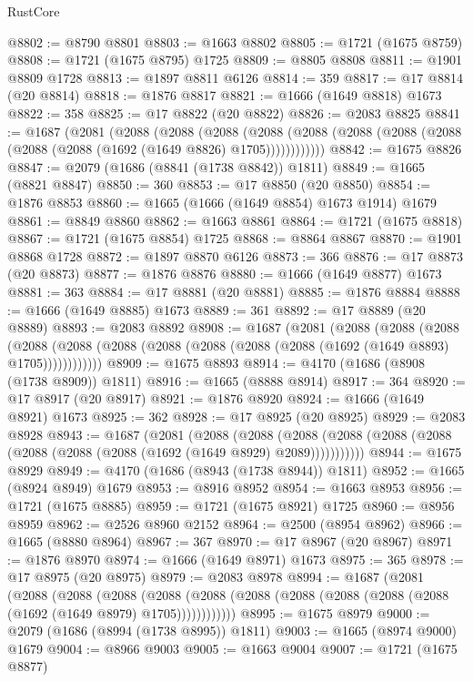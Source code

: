 \begin{lexlean}{RustCore}
\begin{coremodule}
@8802 := @8790 @8801
@8803 := @1663 @8802
@8805 := @1721 (@1675 @8759)
@8808 := @1721 (@1675 @8795) @1725
@8809 := @8805 @8808
@8811 := @1901 @8809 @1728
@8813 := @1897 @8811 @6126
@8814 := 359
@8817 := @17 @8814 (@20 @8814)
@8818 := @1876 @8817
@8821 := @1666 (@1649 @8818) @1673
@8822 := 358
@8825 := @17 @8822 (@20 @8822)
@8826 := @2083 @8825
@8841 := @1687
    (@2081
      (@2088
        (@2088
          (@2088
            (@2088 (@2088 (@2088 (@2088 (@2088 (@2088 (@2088 (@1692 (@1649 @8826) @1705))))))))))))
@8842 := @1675 @8826
@8847 := @2079 (@1686 (@8841 (@1738 @8842)) @1811)
@8849 := @1665 (@8821 @8847)
@8850 := 360
@8853 := @17 @8850 (@20 @8850)
@8854 := @1876 @8853
@8860 := @1665 (@1666 (@1649 @8854) @1673 @1914) @1679
@8861 := @8849 @8860
@8862 := @1663 @8861
@8864 := @1721 (@1675 @8818)
@8867 := @1721 (@1675 @8854) @1725
@8868 := @8864 @8867
@8870 := @1901 @8868 @1728
@8872 := @1897 @8870 @6126
@8873 := 366
@8876 := @17 @8873 (@20 @8873)
@8877 := @1876 @8876
@8880 := @1666 (@1649 @8877) @1673
@8881 := 363
@8884 := @17 @8881 (@20 @8881)
@8885 := @1876 @8884
@8888 := @1666 (@1649 @8885) @1673
@8889 := 361
@8892 := @17 @8889 (@20 @8889)
@8893 := @2083 @8892
@8908 := @1687
    (@2081
      (@2088
        (@2088
          (@2088
            (@2088 (@2088 (@2088 (@2088 (@2088 (@2088 (@2088 (@1692 (@1649 @8893) @1705))))))))))))
@8909 := @1675 @8893
@8914 := @4170 (@1686 (@8908 (@1738 @8909)) @1811)
@8916 := @1665 (@8888 @8914)
@8917 := 364
@8920 := @17 @8917 (@20 @8917)
@8921 := @1876 @8920
@8924 := @1666 (@1649 @8921) @1673
@8925 := 362
@8928 := @17 @8925 (@20 @8925)
@8929 := @2083 @8928
@8943 := @1687
    (@2081
      (@2088
        (@2088
          (@2088 (@2088 (@2088 (@2088 (@2088 (@2088 (@2088 (@1692 (@1649 @8929) @2089)))))))))))
@8944 := @1675 @8929
@8949 := @4170 (@1686 (@8943 (@1738 @8944)) @1811)
@8952 := @1665 (@8924 @8949) @1679
@8953 := @8916 @8952
@8954 := @1663 @8953
@8956 := @1721 (@1675 @8885)
@8959 := @1721 (@1675 @8921) @1725
@8960 := @8956 @8959
@8962 := @2526 @8960 @2152
@8964 := @2500 (@8954 @8962)
@8966 := @1665 (@8880 @8964)
@8967 := 367
@8970 := @17 @8967 (@20 @8967)
@8971 := @1876 @8970
@8974 := @1666 (@1649 @8971) @1673
@8975 := 365
@8978 := @17 @8975 (@20 @8975)
@8979 := @2083 @8978
@8994 := @1687
    (@2081
      (@2088
        (@2088
          (@2088
            (@2088 (@2088 (@2088 (@2088 (@2088 (@2088 (@2088 (@1692 (@1649 @8979) @1705))))))))))))
@8995 := @1675 @8979
@9000 := @2079 (@1686 (@8994 (@1738 @8995)) @1811)
@9003 := @1665 (@8974 @9000) @1679
@9004 := @8966 @9003
@9005 := @1663 @9004
@9007 := @1721 (@1675 @8877)

\end{coremodule}
\end{lexlean}
